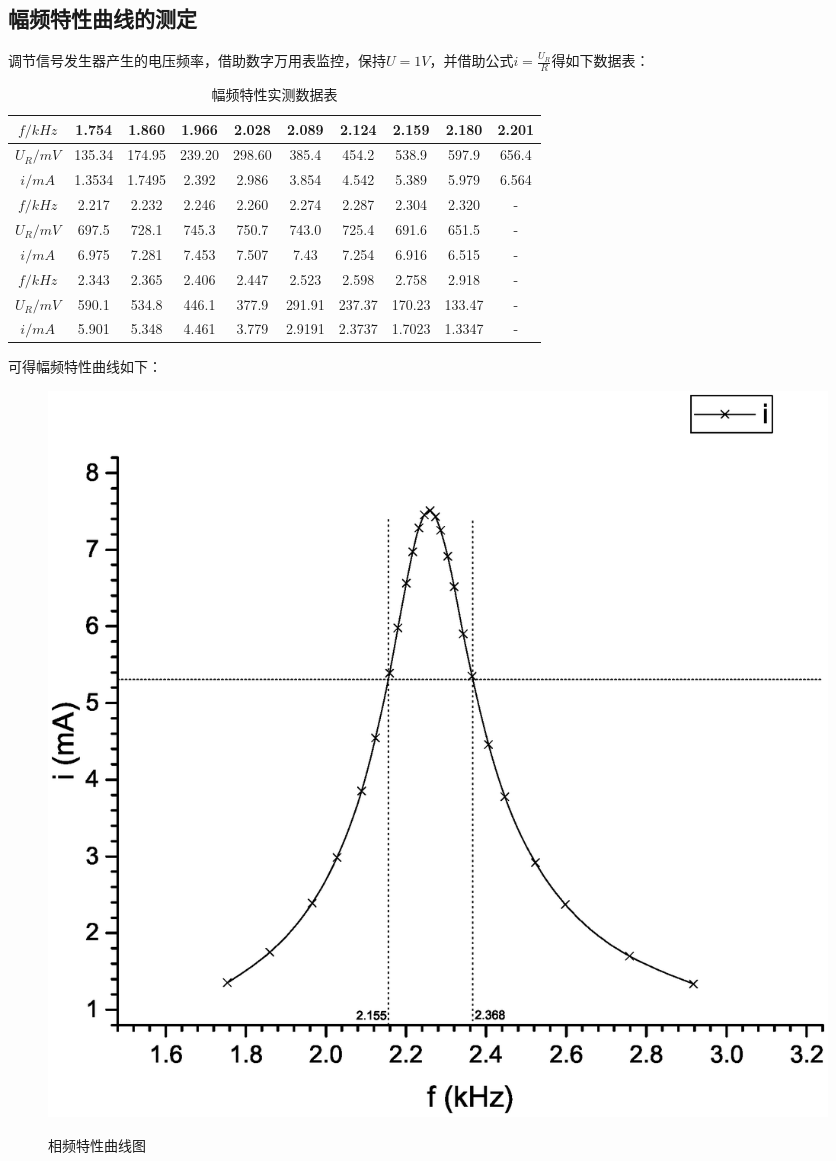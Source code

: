 \documentclass{ctexart}
\begin{document}
\subsection{幅频特性曲线的测定}
调节信号发生器产生的电压频率，借助数字万用表监控，保持$U=1V$，并借助公式$i=\frac{U_R}{R}$得如下数据表：
\begin{table}[H]
  \centering
  \caption{幅频特性实测数据表}
    \begin{tabular}{|c|c|c|c|c|c|c|c|c|c|}\hline
    $f/kHz$ & 1.754 & 1.860 & 1.966 & 2.028 & 2.089 & 2.124 & 2.159 & 2.180 & 2.201 \\\hline
    $U_R/mV$ & 135.34 & 174.95 & 239.20 & 298.60 & 385.4 & 454.2 & 538.9 & 597.9 & 656.4 \\\hline
    $i/mA$ & 1.3534 & 1.7495 & 2.392 & 2.986 & 3.854 & 4.542 & 5.389 & 5.979 & 6.564 \\\hline
    $f/kHz$ & 2.217 & 2.232 & 2.246 & 2.260 & 2.274 & 2.287 & 2.304 & 2.320 & - \\\hline
    $U_R/mV$ & 697.5 & 728.1 & 745.3 & 750.7 & 743.0 & 725.4 & 691.6 & 651.5 & - \\\hline
    $i/mA$ & 6.975 & 7.281 & 7.453 & 7.507 & 7.43  & 7.254 & 6.916 & 6.515 &  -\\\hline
    $f/kHz$ & 2.343 & 2.365 & 2.406 & 2.447 & 2.523 & 2.598 & 2.758 & 2.918 &  -\\\hline
    $U_R/mV$ & 590.1 & 534.8 & 446.1 & 377.9 & 291.91 & 237.37 & 170.23 & 133.47 &-  \\\hline
    $i/mA$ & 5.901 & 5.348 & 4.461 & 3.779 & 2.9191 & 2.3737 & 1.7023 & 1.3347 &  -\\\hline
    \end{tabular}%
  \label{tab:addlabel}%
\end{table}%
可得幅频特性曲线如下：
\begin{figure}[H]
  \centering
  \caption{相频特性曲线图}
  \includegraphics[width=1.0\textwidth]{2}
  \label{fig:digit}
\end{figure}
\end{document}
